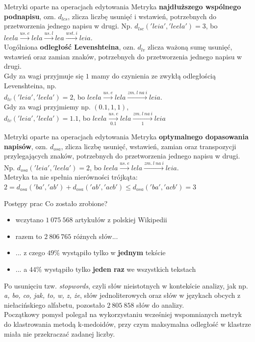 \documentclass[11pt,pdftex,mathserif]{beamer}\usepackage[]{graphicx}\usepackage[]{color}
\theoremstyle{definition}
\begin{document}
\begin{frame}{Metryki oparte na operacjach edytowania}
Metryka \textbf{najdłuższego wspólnego podnapisu}, ozn. $d_{lcs}$, zlicza liczbę usunięć i wstawień, potrzebnych do przetworzenia jednego napisu w drugi. Np. $d_{lsc}('leia', 'leela') = 3$, bo $leela  \xrightarrow{us.\ e} lela  \xrightarrow{us.\ l} lea  \xrightarrow{wst.\ i} leia$.\\
\pause
Uogólniona \textbf{odległość Levenshteina}, ozn. $d_{lv}$ zlicza ważoną sumę usunięć, wstawień oraz zamian znaków, potrzebnych do przetworzenia jednego napisu w drugi. \\


\pause
Gdy za wagi przyjmuje się $1$ mamy do czynienia ze zwykłą odległością Levenshteina, np. \\
$d_{lv}('leia', 'leela') = 2$, bo $leela  \xrightarrow{us.\ e} lela  \xrightarrow{zm.\ l\ na\ i} leia$. \\
\pause
Gdy za wagi przyjmiemy np. $(0.1, 1, 1)$, \\
$d_{lv}('leia', 'leela') = 1.1$, bo $leela  \xrightarrow[0.1]{us.\ e} lela  \xrightarrow[1]{zm.\ l\ na\ i} leia$ 
\end{frame}



\begin{frame}{Metryki oparte na operacjach edytowania}
Metryka \textbf{optymalnego dopasowania napisów}, ozn. $d_{osa}$, zlicza liczbę usunięć, wstawień, zamian oraz transpozycji przylegających znaków, potrzebnych do przetworzenia jednego napisu w drugi. Np. $d_{osa}('leia', 'leela') = 2$, bo $leela  \xrightarrow{us.\ e} lela  \xrightarrow{zm.\ l\ na\ i} leia$. \\
\pause
Metryka ta nie spełnia nierówności trójkąta: $2 = d_{osa}('ba', 'ab') + d_{osa}('ab', 'acb') \leq d_{osa}('ba', 'acb') = 3$\\
\end{frame}

\begin{frame}{Postępy prac}
Co zostało zrobione?\\
\begin{itemize}
\item wczytano $1\ 075 \ 568$ artykułów z polskiej Wikipedii \pause
\item razem to $2\ 806\ 765$ różnych słów... \pause
\item ... z czego $49\%$ wystąpiło tylko w \textbf{jednym} tekście
\item ... a $44\%$ wystąpiło tylko \textbf{jeden raz} we wszystkich tekstach
\end{itemize}
\pause
Po usunięciu tzw. \emph{stopwords}, czyli słów nieistotnych w kontekście analizy, jak np. \emph{a, bo, co, jak, to, w, z, że}, słów jednoliterowych oraz słów w językach obcych z niełacińskiego alfabetu, pozostało $2\ 805\ 858$ słów do analizy.\\
\pause
Początkowy pomysł polegał na wykorzystaniu wcześniej wspomnianych metryk do klastrowania metodą k-medoidów, przy czym maksymalna odległość w klastrze miała nie przekraczać zadanej liczby.
\end{frame}
\end{document}
